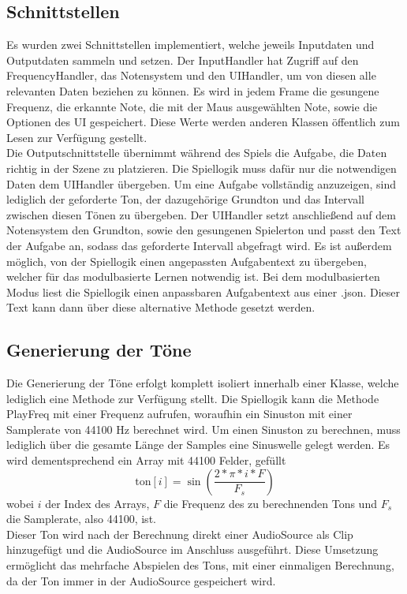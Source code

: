 \subsection*{Schnittstellen}
Es wurden zwei Schnittstellen implementiert, welche jeweils Inputdaten und Outputdaten sammeln und setzen. Der InputHandler hat Zugriff auf den FrequencyHandler, das Notensystem und den UIHandler, um von diesen alle relevanten Daten beziehen zu können. Es wird in jedem Frame die gesungene Frequenz, die erkannte Note, die mit der Maus ausgewählten Note, sowie die Optionen des UI gespeichert. Diese Werte werden anderen Klassen öffentlich zum Lesen zur Verfügung gestellt. \\
Die Outputschnittstelle übernimmt während des Spiels die Aufgabe, die Daten richtig in der Szene zu platzieren. Die Spiellogik muss dafür nur die notwendigen Daten dem UIHandler übergeben. Um eine Aufgabe vollständig anzuzeigen, sind lediglich der geforderte Ton, der dazugehörige Grundton und das Intervall zwischen diesen Tönen zu übergeben. Der UIHandler setzt anschließend auf dem Notensystem den Grundton, sowie den gesungenen Spielerton und passt den Text der Aufgabe an, sodass das geforderte Intervall abgefragt wird. Es ist außerdem möglich, von der Spiellogik einen angepassten Aufgabentext zu übergeben, welcher für das modulbasierte Lernen notwendig ist. Bei dem modulbasierten Modus liest die Spiellogik einen anpassbaren Aufgabentext aus einer .json. Dieser Text kann dann über diese alternative Methode gesetzt werden. 

\subsection*{Generierung der Töne}
Die Generierung der Töne erfolgt komplett isoliert innerhalb einer Klasse, welche lediglich eine Methode zur Verfügung stellt. Die Spiellogik kann die Methode PlayFreq mit einer Frequenz aufrufen, woraufhin ein Sinuston mit einer Samplerate von 44100 Hz berechnet wird. Um einen Sinuston zu berechnen, muss lediglich über die gesamte Länge der Samples eine Sinuswelle gelegt werden. Es wird dementsprechend ein Array mit 44100 Felder, gefüllt
$$\text{ton}[i] = \sin(\frac{2 * \pi * i * F}{F_s})$$ 
wobei $i$ der Index des Arrays, $F$ die Frequenz des zu berechnenden Tons und $F_s$ die Samplerate, also 44100, ist.\\
Dieser Ton wird nach der Berechnung direkt einer AudioSource als Clip hinzugefügt und die AudioSource im Anschluss ausgeführt. Diese Umsetzung ermöglicht das mehrfache Abspielen des Tons, mit einer einmaligen Berechnung, da der Ton immer in der AudioSource gespeichert wird. 

